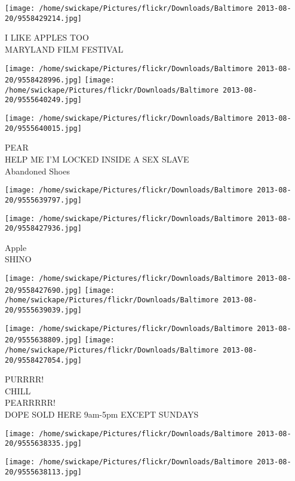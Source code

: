 \documentclass[10pt,letterpaper]{article}
\begin{document}
\vspace{0.25in}
\texttt{[image: /home/swickape/Pictures/flickr/Downloads/Baltimore 2013-08-20/9558429214.jpg]}

I LIKE APPLES TOO\\
MARYLAND FILM FESTIVAL
\pagebreak

\texttt{[image: /home/swickape/Pictures/flickr/Downloads/Baltimore 2013-08-20/9558428996.jpg]}
\texttt{[image: /home/swickape/Pictures/flickr/Downloads/Baltimore 2013-08-20/9555640249.jpg]}

\vspace{0.25in}
\texttt{[image: /home/swickape/Pictures/flickr/Downloads/Baltimore 2013-08-20/9555640015.jpg]}

PEAR\\
HELP ME I'M LOCKED INSIDE A SEX SLAVE\\
Abandoned Shoes
\pagebreak

\texttt{[image: /home/swickape/Pictures/flickr/Downloads/Baltimore 2013-08-20/9555639797.jpg]}

\vspace{0.25in}
\texttt{[image: /home/swickape/Pictures/flickr/Downloads/Baltimore 2013-08-20/9558427936.jpg]}

Apple\\
SHINO
\pagebreak

\texttt{[image: /home/swickape/Pictures/flickr/Downloads/Baltimore 2013-08-20/9558427690.jpg]}
\texttt{[image: /home/swickape/Pictures/flickr/Downloads/Baltimore 2013-08-20/9555639039.jpg]}

\texttt{[image: /home/swickape/Pictures/flickr/Downloads/Baltimore 2013-08-20/9555638809.jpg]}
\texttt{[image: /home/swickape/Pictures/flickr/Downloads/Baltimore 2013-08-20/9558427054.jpg]}

PURRRR!\\
CHILL\\
PEARRRRR!\\
DOPE SOLD HERE 9am{-}5pm EXCEPT SUNDAYS
\pagebreak

\texttt{[image: /home/swickape/Pictures/flickr/Downloads/Baltimore 2013-08-20/9555638335.jpg]}

\vspace{0.25in}
\texttt{[image: /home/swickape/Pictures/flickr/Downloads/Baltimore 2013-08-20/9555638113.jpg]}
\end{document}
